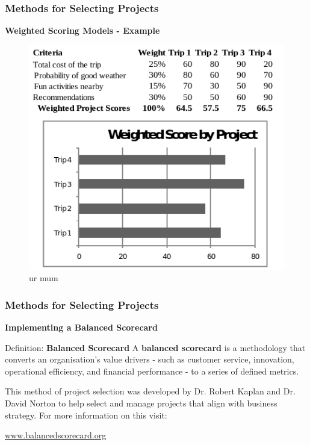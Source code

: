 \documentclass[aspectratio=169]{beamer}
\begin{document}
\begin{frame}
\frametitle{Methods for Selecting Projects}
\textbf{Weighted Scoring Models - Example}\\
\vspace{0.5cm}
\begin{figure}
\includegraphics[scale=0.4]{weighted_scoring}
\caption{ur mum}
\end{figure}
\end{frame}
\begin{frame}
\frametitle{Methods for Selecting Projects}
\textbf{Implementing a Balanced Scorecard}\\
\vspace{0.5cm}
\begin{block}{Definition: \textbf{Balanced Scorecard}}
A \textbf{balanced scorecard} is a methodology that converts an organisation's value drivers - such as customer service, innovation, operational efficiency, and financial performance - to a series of defined metrics.
\end{block}
\vspace{0.5cm}
This method of project selection was developed by Dr. Robert Kaplan and Dr. David Norton to help select and manage projects that align with business strategy. For more information on this visit:
\begin{center}
\url{www.balancedscorecard.org}
\end{center}
\end{frame}
\end{document}
